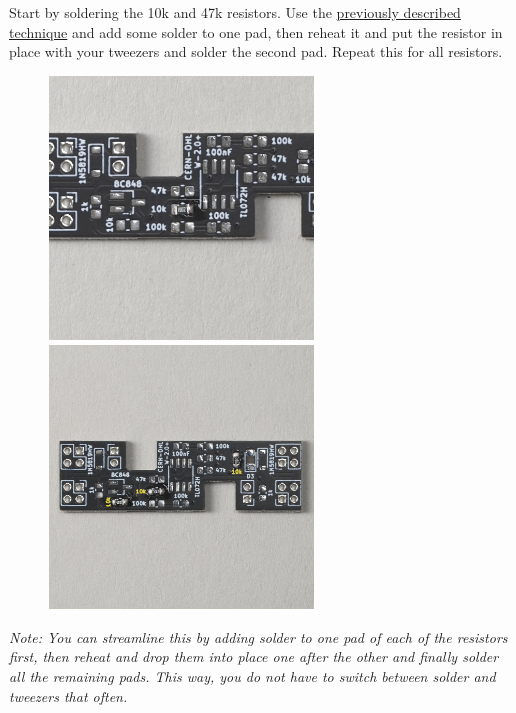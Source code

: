 \documentclass[12pt, a4paper]{article}
\begin{document}
Start by soldering the 10k and 47k resistors. Use the
\hyperref[sec:basic_smd_soldering_techniques]{previously described technique} and add some
solder to one pad, then reheat it and put the resistor in place with your tweezers and solder
the second pad. Repeat this for all resistors.

\begin{figure}[H]
    \centering
    \includegraphics[width=7cm]{images/03_03_one_10k_soldered.jpg}
    \hspace{2mm}
    \includegraphics[width=7cm]{images/03_04_10ks_soldered.jpg}
\end{figure}

\textit{Note: You can streamline this by adding solder to one pad of each of the resistors
first, then reheat and drop them into place one after the other and finally solder all the
remaining pads. This way, you do not have to switch between solder and tweezers that often.}
\end{document}
